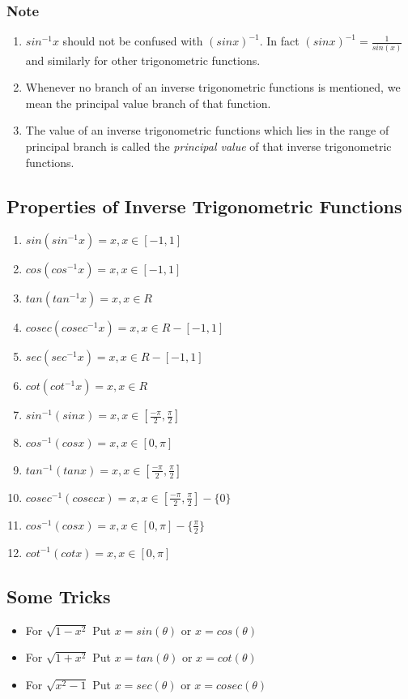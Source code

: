\documentclass[12pt]{article}
\begin{document}
\begin{multicols}{2}
\subsubsection*{Note}
\begin{enumerate}
    \item $sin^{-1}x$ should not be confused with $(sin x)^{-1}$. In fact $(sin x)^{-1} =\frac{1}{sin(x)}$ and
similarly for other trigonometric functions.
\item Whenever no branch of an inverse trigonometric functions is mentioned, we
mean the principal value branch of that function.

\item The value of an inverse trigonometric functions which lies in the range of
principal branch is called the \emph{principal value} of that inverse trigonometric
functions.
\end{enumerate}

\subsection*{Properties of Inverse Trigonometric Functions}
\begin{enumerate}
    \item $sin(sin^{-1}x)=x, x \in [-1,1] $
    \item $cos(cos^{-1}x)=x, x \in [-1,1] $
    \item $tan(tan^{-1}x)=x, x \in R $
    \item $cosec(cosec^{-1}x)=x, x \in R-[-1,1] $
    \item $sec(sec^{-1}x)=x, x \in R-[-1,1] $
    \item $cot(cot^{-1}x)=x, x \in R $
    \linebreak
    \item $sin^{-1}(sinx)=x, x \in [\frac{- \pi}{2},\frac{\pi}{2}]$
    \item $cos^{-1}(cosx)=x, x \in [0,\pi]$
    \item $tan^{-1}(tanx)=x, x \in [\frac{- \pi}{2},\frac{\pi}{2}]$
    \item $cosec^{-1}(cosecx)=x, x \in [\frac{- \pi}{2},\frac{\pi}{2}]-\{0\}$
    \item $cos^{-1}(cosx)=x, x \in [0,\pi]-\{\frac{\pi}{2}\}$
    \item $cot^{-1}(cotx)=x, x \in [0,\pi]$
\end{enumerate}

\subsection*{Some Tricks}
\begin{itemize}
  \item For $\sqrt{1-x^2}$ Put $x=sin(\theta)$ or $x=cos(\theta)$
  \item For $\sqrt{1+x^2}$ Put $x=tan(\theta)$ or $x=cot(\theta)$
  \item For $\sqrt{x^2-1}$ Put $x=sec(\theta)$ or $x=cosec(\theta)$


\end{itemize}
\end{multicols}
\end{document}
